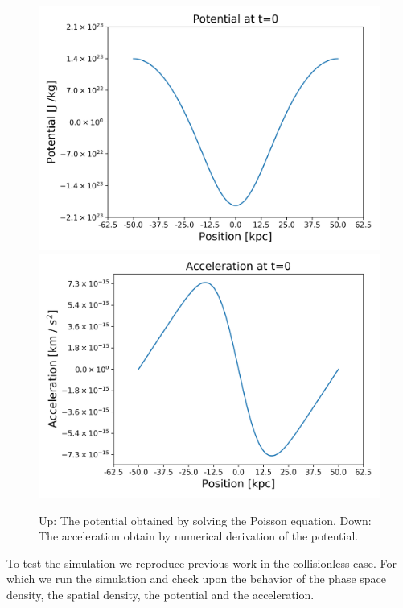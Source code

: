 \begin{figure}[ht!]
    \centering
    \includegraphics[scale=0.6]{imag/1dInitPot.png}
    \includegraphics[scale=0.6]{imag/1dInitAcce.png}
    \caption{Up: The potential obtained by solving the Poisson equation. Down: The acceleration obtain by numerical derivation of the potential.}
    \label{1dInit2}
\end{figure}


To test the simulation we reproduce previous work in the collisionless case. For which we run the simulation and check upon the behavior of the phase space density, the spatial density, the potential and the acceleration. 


